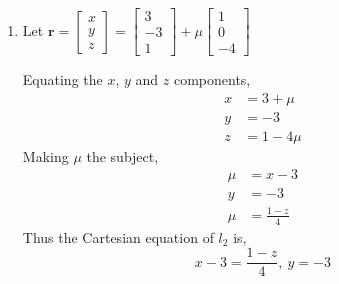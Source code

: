 \documentclass[11pt,a4paper]{book}
\begin{document}
\begin{example}
\begin{minipage}[t]{0.5\textwidth}
\begin{enumerate}[label=(\alph*)]
\end{enumerate}

\end{minipage}
\begin{minipage}[t]{0.5\textwidth}

\begin{enumerate}[label=(\alph*),start=2]

\item  Let $\textbf{r}=\begin{bmatrix}x\\
y\\
z
\end{bmatrix}=\begin{bmatrix}3\\
-3\\
1
\end{bmatrix}+\mu\begin{bmatrix}1\\
0\\
-4
\end{bmatrix}$

Equating the $x$, $y$ and $z$ components,
\begin{align*}
x & =3+\mu\\
y & =-3\\
z & =1-4\mu
\end{align*}
Making $\mu$ the subject,
\begin{align*}
\mu & =x-3\\
y & =-3\\
\mu & =\frac{1-z}{4}
\end{align*}
Thus the Cartesian equation of $l_{2}$ is,
\[
x-3=\frac{1-z}{4},\:y=-3
\]

\end{enumerate}

\end{minipage}

\end{example}
\end{document}
